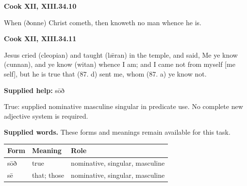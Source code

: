 \par\begin{minipage}{\linewidth}\raggedright
\textbf{Cook XII, XIII.34.10}

When (ðonne) Christ cometh, then knoweth no man whence he is.

\end{minipage}\par\addvspace{4pt}

\par\begin{minipage}{\linewidth}\raggedright
\textbf{Cook XII, XIII.34.11}

Jesus cried (cleopian) and taught (lǣran) in the temple, and said, Me ye know (cunnan), and ye know (witan) whence I am; and I came not from myself [me self], but he is true that (87. d) sent me, whom (87. a) ye know not.

\textbf{Supplied help:} sōð

True: supplied nominative masculine singular in predicate use. No complete new adjective system is required.

\end{minipage}\par\addvspace{4pt}

\textbf{Supplied words.} These forms and meanings remain available for this task.

\par\begingroup
\fontsize{10.5}{13.2}\selectfont
\setlength{\LTleft}{0pt}\setlength{\LTright}{\fill}
\noindent
\begin{tabular}{@{}>{\raggedright\arraybackslash}p{29.59mm}>{\raggedright\arraybackslash}p{29.59mm}>{\raggedright\arraybackslash}p{59.19mm}@{}}
\toprule
\textbf{Form} & \textbf{Meaning} & \textbf{Role} \\
\midrule
sōð & true & nominative, singular, masculine \\
sē & that; those & nominative, singular, masculine \\
\bottomrule
\end{tabular}
\par\endgroup

